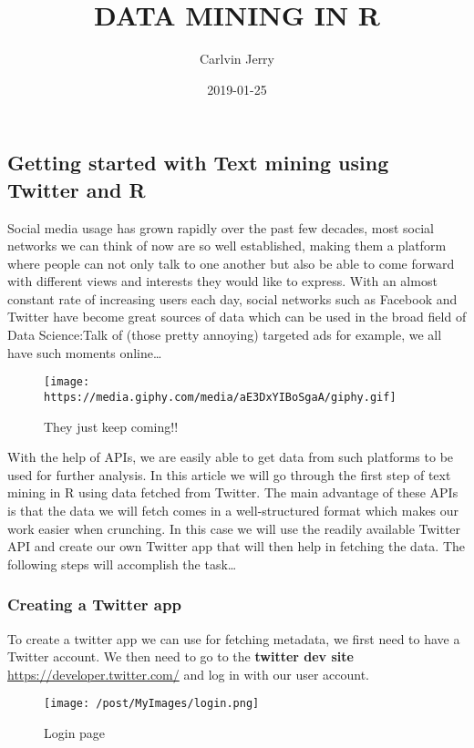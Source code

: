 \documentclass[]{article}
\title{DATA MINING IN R}
\author{Carlvin Jerry}
\date{2019-01-25}
\begin{document}
\maketitle

\subsection{Getting started with Text mining using Twitter and
R}\label{getting-started-with-text-mining-using-twitter-and-r}

Social media usage has grown rapidly over the past few decades, most
social networks we can think of now are so well established, making them
a platform where people can not only talk to one another but also be
able to come forward with different views and interests they would like
to express. With an almost constant rate of increasing users each day,
social networks such as Facebook and Twitter have become great sources
of data which can be used in the broad field of Data Science:Talk of
(those pretty annoying) targeted ads for example, we all have such
moments online\ldots{}

\begin{figure}
\centering
\texttt{[image: https://media.giphy.com/media/aE3DxYIBoSgaA/giphy.gif]}
\caption{They just keep coming!!}
\end{figure}

With the help of APIs, we are easily able to get data from such
platforms to be used for further analysis. In this article we will go
through the first step of text mining in R using data fetched from
Twitter. The main advantage of these APIs is that the data we will fetch
comes in a well-structured format which makes our work easier when
crunching. In this case we will use the readily available Twitter API
and create our own Twitter app that will then help in fetching the data.
The following steps will accomplish the task\ldots{}

\subsubsection{Creating a Twitter app}\label{creating-a-twitter-app}

To create a twitter app we can use for fetching metadata, we first need
to have a Twitter account. We then need to go to the \textbf{twitter dev
site} \url{https://developer.twitter.com/} and log in with our user
account.

\begin{figure}
\centering
\texttt{[image: /post/MyImages/login.png]}
\caption{Login page}
\end{figure}
\end{document}
